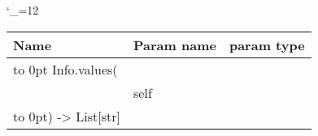 \begingroup \catcode`\_=12 \tt
\begin{tabular}{lll}
\toprule
\textrm{Name}&\textrm{Param name}&\textrm{param type}\\
\midrule
\hbox to 0pt {Info.values(\hss}\\
& self\\
\hbox to 0pt{) -> List[str]\hss}\\
\bottomrule
\end{tabular}
\endgroup
